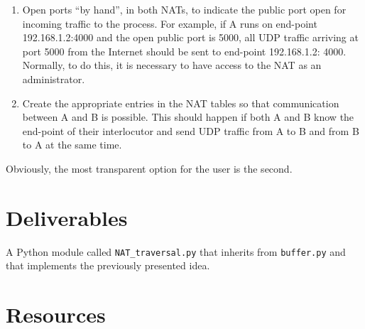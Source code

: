 \begin{enumerate}
\item Open ports ``by hand'', in both NATs, to indicate the public
  port open for incoming traffic to the process. For example, if A
  runs on end-point 192.168.1.2:4000 and the open public port is 5000,
  all UDP traffic arriving at port 5000 from the Internet should be
  sent to end-point 192.168.1.2: 4000. Normally, to do this, it is
  necessary to have access to the NAT as an administrator.

\item Create the appropriate entries in the NAT tables so that
  communication between A and B is possible. This should happen if
  both A and B know the end-point of their interlocutor and send UDP
  traffic from A to B and from B to A at the same time.
\end{enumerate}
  
Obviously, the most transparent option for the user is the second.

\section{Deliverables}

A Python module called \texttt{NAT\_traversal.py} that inherits from
\texttt{buffer.py} and that implements the previously presented idea.

\section{Resources}


